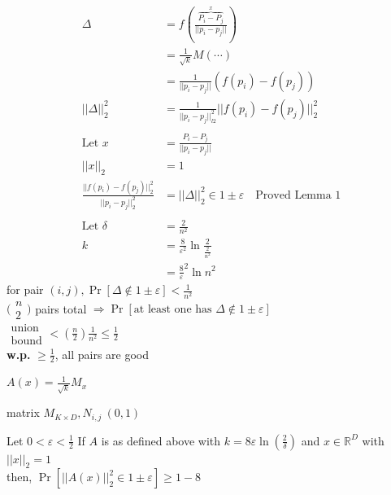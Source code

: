 \documentclass[12pt]{article}
\begin{document}
\begin{enumerate}[align=left, labelwidth=1ex, start=1,label={Lemma \arabic*}]
	\begin{align}
	\Delta &= f\left( \frac{\overbrace{P_i-P_j}^x}{||p_i-p_j||} \right)\\
	&=\frac1{\sqrt k}M(\cdots)\\
	&=\frac{1}{||p_i - p_j||}(f(p_i) - f(p_j))\\
	||\Delta||^2_2&=\frac1{||p_i-p_j||_{l2}^2}||f(p_i)-f(p_j)||^2_{2}\\
	\\
	\text{Let }x&= \frac{P_i-P_j}{||p_i-p_j||}\\
	||x||_{2}&=1\\
	\frac{||f(p_i)-f(p_j)||^2_{2}}{||p_i-p_j||^2_{2}}&=||\Delta||^2_{2}\in 1\pm\varepsilon\quad\text{Proved Lemma 1}\\
	\\
	\text{Let }\delta &= \frac2{n^2}\\
	k&=\frac{8}{\varepsilon^2}\ln\frac2{\frac2{n^2}}\\
	&=\frac8\varepsilon^2\ln{n^2}
	\end{align}
	for pair $(i, j), \Pr \left[\Delta \notin 1 \pm \varepsilon\right] < \frac1{n^2}$\\
	$\big(\begin{smallmatrix}
		n \\
		2
	\end{smallmatrix}\big)$
	pairs total $\Rightarrow \Pr \left[\text{at least one has } \Delta \notin 1\pm \varepsilon \right]$\\
	$\begin{smallmatrix}
	\text{union} \\
	\text{bound}
	\end{smallmatrix} < (\frac n{2})\frac{1}{n^2} \leq \frac{1}{2}$\\
	\textbf{w.p.} $\geq \frac{1}{2}$, all pairs are good
	
	$A(x) = \frac1{\sqrt k}M_x$
	
	matrix $M_{K \times D}, N_{i,j}~(0,1)$
	
	Let $0<\varepsilon < \frac1{2}$ If $A$ is as defined above with $k=8\varepsilon \ln (\frac2{\delta})$ and $x \in \mathbb{R}^D$ with$||x||_2 = 1$\\
	then, $\Pr\left[||A(x)||^2_2 \in 1 \pm \varepsilon \right] \geq 1-8$
	

\end{enumerate}
\end{document}
